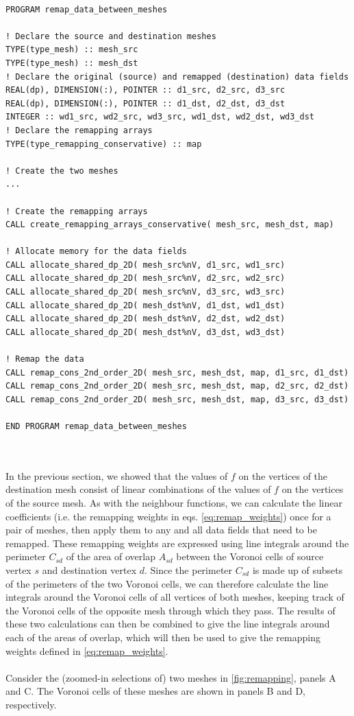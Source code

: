 \documentclass{article}
\begin{document}
\hrulefill
\begin{lstlisting}

PROGRAM remap_data_between_meshes

! Declare the source and destination meshes
TYPE(type_mesh) :: mesh_src
TYPE(type_mesh) :: mesh_dst
! Declare the original (source) and remapped (destination) data fields
REAL(dp), DIMENSION(:), POINTER :: d1_src, d2_src, d3_src
REAL(dp), DIMENSION(:), POINTER :: d1_dst, d2_dst, d3_dst
INTEGER :: wd1_src, wd2_src, wd3_src, wd1_dst, wd2_dst, wd3_dst
! Declare the remapping arrays
TYPE(type_remapping_conservative) :: map

! Create the two meshes
...

! Create the remapping arrays
CALL create_remapping_arrays_conservative( mesh_src, mesh_dst, map)

! Allocate memory for the data fields
CALL allocate_shared_dp_2D( mesh_src%nV, d1_src, wd1_src)
CALL allocate_shared_dp_2D( mesh_src%nV, d2_src, wd2_src)
CALL allocate_shared_dp_2D( mesh_src%nV, d3_src, wd3_src)
CALL allocate_shared_dp_2D( mesh_dst%nV, d1_dst, wd1_dst)
CALL allocate_shared_dp_2D( mesh_dst%nV, d2_dst, wd2_dst)
CALL allocate_shared_dp_2D( mesh_dst%nV, d3_dst, wd3_dst)

! Remap the data
CALL remap_cons_2nd_order_2D( mesh_src, mesh_dst, map, d1_src, d1_dst)
CALL remap_cons_2nd_order_2D( mesh_src, mesh_dst, map, d2_src, d2_dst)
CALL remap_cons_2nd_order_2D( mesh_src, mesh_dst, map, d3_src, d3_dst)

END PROGRAM remap_data_between_meshes

\end{lstlisting}
\hrulefill
\\
\\
In the previous section, we showed that the values of $f$ on the vertices of the destination mesh consist of linear combinations of the values of $f$ on the vertices of the source mesh. As with the neighbour functions, we can calculate the linear coefficients (i.e. the remapping weights in eqs. \eqref{eq:remap_weights}) once for a pair of meshes, then apply them to any and all data fields that need to be remapped. These remapping weights are expressed using line integrals around the perimeter $C_{sd}$ of the area of overlap $A_{sd}$ between the Voronoi cells of source vertex $s$ and destination vertex $d$. Since the perimeter $C_{sd}$ is made up of subsets of the perimeters of the two Voronoi cells, we can therefore calculate the line integrals around the Voronoi cells of all vertices of both meshes, keeping track of the Voronoi cells of the opposite mesh through which they pass. The results of these two calculations can then be combined to give the line integrals around each of the areas of overlap, which will then be used to give the remapping weights defined in \eqref{eq:remap_weights}.\\
\\
Consider the (zoomed-in selections of) two meshes in \ref{fig:remapping}, panels A and C. The Voronoi cells of these meshes are shown in panels B and D, respectively.
\end{document}
